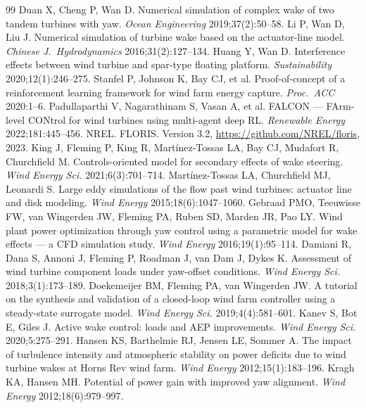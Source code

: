 \documentclass[final,5p,times]{elsarticle}
\begin{document}
\begin{thebibliography}{99}
 Duan X, Cheng P, Wan D. Numerical simulation of complex wake of two tandem turbines with yaw. \emph{Ocean Engineering} 2019;37(2):50--58.
 Li P, Wan D, Liu J. Numerical simulation of turbine wake based on the actuator-line model. \emph{Chinese J.\ Hydrodynamics} 2016;31(2):127--134.
 Huang Y, Wan D. Interference effects between wind turbine and spar-type floating platform. \emph{Sustainability} 2020;12(1):246--275.
 Stanfel P, Johnson K, Bay CJ, et al. Proof-of-concept of a reinforcement learning framework for wind farm energy capture. \emph{Proc.\ ACC} 2020:1--6.
 Padullaparthi V, Nagarathinam S, Vasan A, et al. FALCON --- FArm-level CONtrol for wind turbines using multi-agent deep RL. \emph{Renewable Energy} 2022;181:445--456.
 NREL. FLORIS. Version 3.2, \url{https://github.com/NREL/floris}, 2023.
 King J, Fleming P, King R, Mart\'inez-Tossas LA, Bay CJ, Mudafort R, Churchfield M. Controls-oriented model for secondary effects of wake steering. \emph{Wind Energy Sci.} 2021;6(3):701--714.
 Mart\'inez-Tossas LA, Churchfield MJ, Leonardi S. Large eddy simulations of the flow past wind turbines: actuator line and disk modeling. \emph{Wind Energy} 2015;18(6):1047--1060.
 Gebraad PMO, Teeuwisse FW, van Wingerden JW, Fleming PA, Ruben SD, Marden JR, Pao LY. Wind plant power optimization through yaw control using a parametric model for wake effects --- a CFD simulation study. \emph{Wind Energy} 2016;19(1):95--114.
 Damiani R, Dana S, Annoni J, Fleming P, Roadman J, van Dam J, Dykes K. Assessment of wind turbine component loads under yaw-offset conditions. \emph{Wind Energy Sci.} 2018;3(1):173--189.
 Doekemeijer BM, Fleming PA, van Wingerden JW. A tutorial on the synthesis and validation of a closed-loop wind farm controller using a steady-state surrogate model. \emph{Wind Energy Sci.} 2019;4(4):581--601.
 Kanev S, Bot E, Giles J. Active wake control: loads and AEP improvements. \emph{Wind Energy Sci.} 2020;5:275--291.
 Hansen KS, Barthelmie RJ, Jensen LE, Sommer A. The impact of turbulence intensity and atmospheric stability on power deficits due to wind turbine wakes at Horns Rev wind farm. \emph{Wind Energy} 2012;15(1):183--196.
 Kragh KA, Hansen MH. Potential of power gain with improved yaw alignment. \emph{Wind Energy} 2012;18(6):979--997.
\end{thebibliography}
\end{document}
